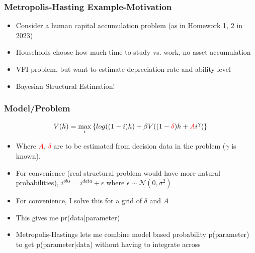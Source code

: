 \documentclass{beamer}
\begin{document}
\begin{frame}
\frametitle[alignment=center]{Metropolis-Hasting Example-Motivation}
\begin{itemize}
\item Consider a human capital accumulation problem (as in Homework 1, 2 in 2023)
\bigskip
\item Households choose how much time to study vs. work, no asset accumulation
\bigskip
\item VFI problem, but want to estimate depreciation rate and ability level
\bigskip
\item Bayesian Structural Estimation!
\end{itemize}
\end{frame}

\begin{frame}
\frametitle[alignment=center]{Model/Problem}
$$V(h)=\underset{i}{\max}\left\{log((1-i)h)+\beta V((1-\color{red}{\delta}\color{black})h+\color{red}{A}\color{black}i^\gamma)\right\}$$
\begin{itemize}
\bigskip
\item Where \textcolor{red}{$A$}, \textcolor{red}{$\delta$} are to be estimated from decision data in the problem ($\gamma$ is known).
\bigskip
\item For convenience (real structural problem would have more natural probabilities), $i^{obs}=i^{data}+\epsilon$ where $\epsilon\sim\mathcal{N}\left(0,\sigma^2\right)$
\bigskip
\item For convenience, I solve this for a grid of $\delta$ and $A$
\bigskip
\item This gives me pr(data|parameter)
\bigskip
\item Metropolis-Hastings lets me combine model based probability p(parameter) to get p(parameter|data) without having to integrate across
\end{itemize}
\end{frame}
\end{document}
